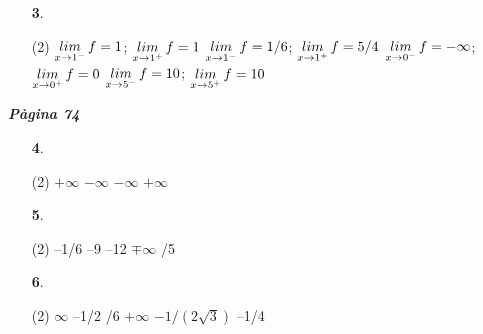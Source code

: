 \documentclass[a4paper, pdf, twoside]{book}
\begin{document}
\begin{multicols}{2}
\begin{enumerate}

 \item[\fontfamily{phv}\selectfont\color{blue}\textbf{3}. ] 
 \begin{tasks}[column-sep=1em, item-indent=1.3333em](2)
	 \task* $\mathop{lim}\limits_{x\to 1^-} f=1$; $\mathop{lim}\limits_{x\to 1^+} f=1$
	 \task* $\mathop{lim}\limits_{x\to 1^-} f=1/6$; $\mathop{lim}\limits_{x\to 1^+} f=5/4$
	 \task* $\mathop{lim}\limits_{x\to 0^-} f=-\infty $; $\mathop{lim}\limits_{x\to 0^+} f=0$
	 \task* $\mathop{lim}\limits_{x\to 5^-} f=10$; $\mathop{lim}\limits_{x\to 5^+} f=10$
\end{tasks}
 \end{enumerate}
\vspace{0.3cm}


{\textbf{\em Pàgina 74}} \hrulefill
\begin{enumerate}
\vspace{0.25cm}



 \item[\fontfamily{phv}\selectfont\color{blue}\textbf{4}. ] 
 \begin{tasks}[column-sep=1em, item-indent=1.3333em](2)
	 \task $+\infty $
	 \task $-\infty $
	 \task $-\infty $
	 \task $+\infty $
\end{tasks}
 \end{enumerate}
\begin{enumerate}
\vspace{0.25cm}



 \item[\fontfamily{phv}\selectfont\color{blue}\textbf{5}. ]  \scalebox{0.6}{\simbolclau } 
 \begin{tasks}[column-sep=1em, item-indent=1.3333em](2)
	 \task --1/6
	 \task --9
	 \task --12
	 \task $\mp \infty $
	 /5
\end{tasks}
\vspace{0.25cm}



 \item[\fontfamily{phv}\selectfont\color{blue}\textbf{6}. ]  \scalebox{0.6}{\simbolclau } 
 \begin{tasks}[column-sep=1em, item-indent=1.3333em](2)
	 \task $\infty $
	 \task --1/2
	 /6
	 \task $+\infty $
	 \task $-1/(2\sqrt {3})$
	 \task --1/4
\end{tasks}
 \end{enumerate}
\vspace{0.3cm}


\end{multicols}
\end{document}
